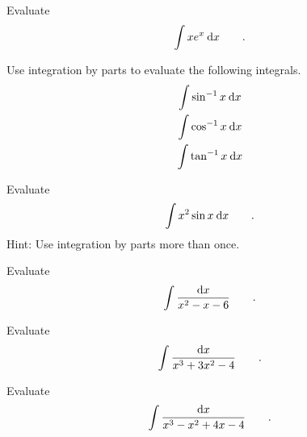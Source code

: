 \begin{hwsection}
\begin{hw}
Evaluate
\begin{equation*}
  \int x e^x \:\textup{d} x \qquad .
\end{equation*}
\end{hw}

\begin{hw}
Use integration by parts to evaluate the following integrals.
\begin{gather*}
  \int \sin^{-1} x\:\textup{d} x \\
  \int \cos^{-1} x\:\textup{d} x \\
  \int \tan^{-1} x\:\textup{d} x 
\end{gather*}
\end{hw}

\begin{hw}
Evaluate
\begin{equation*}
  \int x^2 \sin x \:\textup{d} x \qquad .
\end{equation*}
Hint: Use integration by parts more than once.
\end{hw}

\begin{hw}
Evaluate
\begin{equation*}
  \int \frac{\textup{d} x}{x^2-x-6} \qquad .
\end{equation*}
\end{hw}

\begin{hw}
Evaluate
\begin{equation*}
  \int \frac{\textup{d} x}{x^3+3x^2-4} \qquad .
\end{equation*}
\end{hw}

\begin{hw}
Evaluate
\begin{equation*}
  \int \frac{\textup{d} x}{x^3-x^2+4x-4} \qquad .
\end{equation*}
\end{hw}

\end{hwsection}

